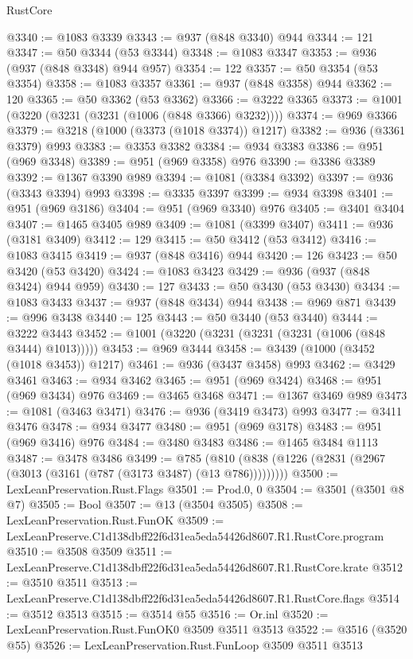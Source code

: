 \begin{lexlean}{RustCore}
\begin{coremodule}
@3340 := @1083 @3339
@3343 := @937 (@848 @3340) @944
@3344 := 121
@3347 := @50 @3344 (@53 @3344)
@3348 := @1083 @3347
@3353 := @936 (@937 (@848 @3348) @944 @957)
@3354 := 122
@3357 := @50 @3354 (@53 @3354)
@3358 := @1083 @3357
@3361 := @937 (@848 @3358) @944
@3362 := 120
@3365 := @50 @3362 (@53 @3362)
@3366 := @3222 @3365
@3373 := @1001 (@3220 (@3231 (@3231 (@1006 (@848 @3366) @3232))))
@3374 := @969 @3366
@3379 := @3218 (@1000 (@3373 (@1018 @3374)) @1217)
@3382 := @936 (@3361 @3379) @993
@3383 := @3353 @3382
@3384 := @934 @3383
@3386 := @951 (@969 @3348)
@3389 := @951 (@969 @3358) @976
@3390 := @3386 @3389
@3392 := @1367 @3390 @989
@3394 := @1081 (@3384 @3392)
@3397 := @936 (@3343 @3394) @993
@3398 := @3335 @3397
@3399 := @934 @3398
@3401 := @951 (@969 @3186)
@3404 := @951 (@969 @3340) @976
@3405 := @3401 @3404
@3407 := @1465 @3405 @989
@3409 := @1081 (@3399 @3407)
@3411 := @936 (@3181 @3409)
@3412 := 129
@3415 := @50 @3412 (@53 @3412)
@3416 := @1083 @3415
@3419 := @937 (@848 @3416) @944
@3420 := 126
@3423 := @50 @3420 (@53 @3420)
@3424 := @1083 @3423
@3429 := @936 (@937 (@848 @3424) @944 @959)
@3430 := 127
@3433 := @50 @3430 (@53 @3430)
@3434 := @1083 @3433
@3437 := @937 (@848 @3434) @944
@3438 := @969 @871
@3439 := @996 @3438
@3440 := 125
@3443 := @50 @3440 (@53 @3440)
@3444 := @3222 @3443
@3452 := @1001 (@3220 (@3231 (@3231 (@3231 (@1006 (@848 @3444) @1013)))))
@3453 := @969 @3444
@3458 := @3439 (@1000 (@3452 (@1018 @3453)) @1217)
@3461 := @936 (@3437 @3458) @993
@3462 := @3429 @3461
@3463 := @934 @3462
@3465 := @951 (@969 @3424)
@3468 := @951 (@969 @3434) @976
@3469 := @3465 @3468
@3471 := @1367 @3469 @989
@3473 := @1081 (@3463 @3471)
@3476 := @936 (@3419 @3473) @993
@3477 := @3411 @3476
@3478 := @934 @3477
@3480 := @951 (@969 @3178)
@3483 := @951 (@969 @3416) @976
@3484 := @3480 @3483
@3486 := @1465 @3484 @1113
@3487 := @3478 @3486
@3499 := @785 (@810 (@838 (@1226 (@2831 (@2967 (@3013 (@3161 (@787 (@3173 @3487) (@13 @786)))))))))
@3500 := LexLeanPreservation.Rust.Flags
@3501 := Prod.{0, 0}
@3504 := @3501 (@3501 @8 @7)
@3505 := Bool
@3507 := @13 (@3504 @3505)
@3508 := LexLeanPreservation.Rust.FunOK
@3509 := LexLeanPreserve.C1d138dbff22f6d31ea5eda54426d8607.R1.RustCore.program
@3510 := @3508 @3509
@3511 := LexLeanPreserve.C1d138dbff22f6d31ea5eda54426d8607.R1.RustCore.krate
@3512 := @3510 @3511
@3513 := LexLeanPreserve.C1d138dbff22f6d31ea5eda54426d8607.R1.RustCore.flags
@3514 := @3512 @3513
@3515 := @3514 @55
@3516 := Or.inl
@3520 := LexLeanPreservation.Rust.FunOK0 @3509 @3511 @3513
@3522 := @3516 (@3520 @55)
@3526 := LexLeanPreservation.Rust.FunLoop @3509 @3511 @3513

\end{coremodule}
\end{lexlean}
